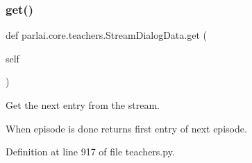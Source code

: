\subsubsection{\texorpdfstring{get()}{get()}}
{\footnotesize\ttfamily def parlai.\+core.\+teachers.\+Stream\+Dialog\+Data.\+get (\begin{DoxyParamCaption}\item[{}]{self }\end{DoxyParamCaption})}

\begin{DoxyVerb}Get the next entry from the stream.

When episode is done returns first entry of next episode.
\end{DoxyVerb}
 

Definition at line 917 of file teachers.\+py.


